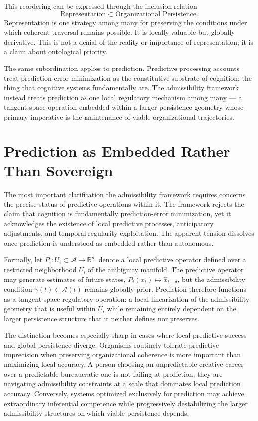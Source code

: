 \documentclass[12pt,oneside]{book}
\theoremstyle{plain}
\theoremstyle{definition}
\theoremstyle{plain}
\newcommand{\cA}{\mathcal{A}}
\begin{document}
This reordering can be expressed through the inclusion relation
\[
\text{Representation} \subset \text{Organizational Persistence}.
\]
Representation is one strategy among many for preserving the conditions under which coherent traversal remains possible. It is locally valuable but globally derivative. This is not a denial of the reality or importance of representation; it is a claim about ontological priority.

The same subordination applies to prediction. Predictive processing accounts treat prediction-error minimization as the constitutive substrate of cognition: the thing that cognitive systems fundamentally are. The admissibility framework instead treats prediction as one local regulatory mechanism among many — a tangent-space operation embedded within a larger persistence geometry whose primary imperative is the maintenance of viable organizational trajectories.

\section{Prediction as Embedded Rather Than Sovereign}

The most important clarification the admissibility framework requires concerns the precise status of predictive operations within it. The framework rejects the claim that cognition is fundamentally prediction-error minimization, yet it acknowledges the existence of local predictive processes, anticipatory adjustments, and temporal regularity exploitation. The apparent tension dissolves once prediction is understood as embedded rather than autonomous.

Formally, let $P_i : U_i \subset \cA \to \mathbb{R}^{n_i}$ denote a local predictive operator defined over a restricted neighborhood $U_i$ of the ambiguity manifold. The predictive operator may generate estimates of future states, $P_i(x_t) \mapsto \hat{x}_{t+\delta}$, but the admissibility condition $\gamma(t) \in \mathcal{A}(t)$ remains globally prior. Prediction therefore functions as a tangent-space regulatory operation: a local linearization of the admissibility geometry that is useful within $U_i$ while remaining entirely dependent on the larger persistence structure that it neither defines nor preserves.

The distinction becomes especially sharp in cases where local predictive success and global persistence diverge. Organisms routinely tolerate predictive imprecision when preserving organizational coherence is more important than maximizing local accuracy. A person choosing an unpredictable creative career over a predictable bureaucratic one is not failing at prediction; they are navigating admissibility constraints at a scale that dominates local prediction accuracy. Conversely, systems optimized exclusively for prediction may achieve extraordinary inferential competence while progressively destabilizing the larger admissibility structures on which viable persistence depends.
\end{document}
